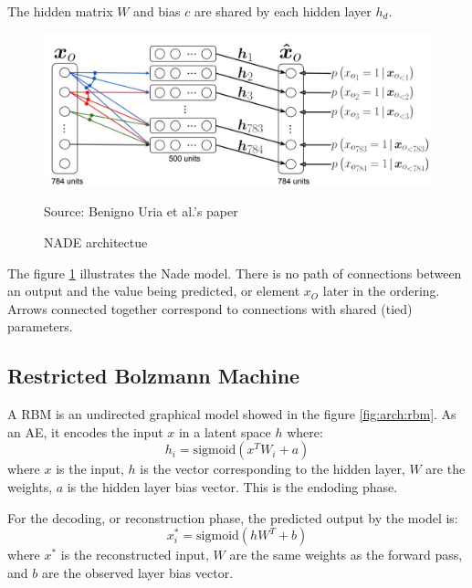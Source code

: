 \documentclass[12pt]{report}
\begin{document}
The hidden matrix $W$ and bias $c$ are shared by each hidden layer $h_{d}$.
\begin{figure}[ht]
    \centering
    \includegraphics[width=0.8 \textwidth]{images/nn/architectures/nade_architecture.jpg}
    \caption{NADE architectue}
    Source: Benigno Uria et al.'s paper \cite{uria_neural_2016}
    \label{fig:arch:nade}
\end{figure}
The figure \ref{fig:arch:nade} illustrates the Nade model.
There is no path of connections between an output and the value being predicted, or element $x_O$ later in the ordering.
Arrows connected together correspond to connections with shared (tied) parameters.

\subsection{Restricted Bolzmann Machine}
\label{sec:back:rbm}

A RBM is an undirected graphical model \cite{noauthor_restricted_2018, montufar_restricted_2018, salakhutdinov_restricted_2007, fischer_introduction_2012} showed in the figure \ref{fig:arch:rbm}.
As an AE, it encodes the input $x$ in a latent space $h$ where:
\begin{equation}
    h_{i} = \text{sigmoid}(x^{T} W_{i} + a)
\end{equation}
where $x$ is the input, $h$ is the vector corresponding to the hidden layer, $W$ are the weights, $a$ is the hidden layer bias vector.
This is the endoding phase.

For the decoding, or reconstruction phase, the predicted output by the model is:
\begin{equation}
    x^{*}_{i} = \text{sigmoid}(h W^{T} + b)
\end{equation}
where $x^{*}$ is the reconstructed input, $W$ are the same weights as the forward pass, and $b$ are the observed layer bias vector.
\end{document}

